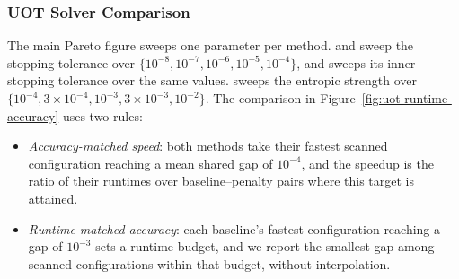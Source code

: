 \subsubsection{UOT Solver Comparison}
\label{app:uot-comparison-protocol}
The main Pareto figure sweeps one parameter per method.
\ours and \mm sweep the stopping tolerance over $\{10^{-8},10^{-7},10^{-6},10^{-5},10^{-4}\}$, and \hellouot sweeps its inner stopping tolerance over the same values.
\sinkhorn sweeps the entropic strength over $\{10^{-4},3\times10^{-4},10^{-3},3\times10^{-3},10^{-2}\}$.
The comparison in Figure~\ref{fig:uot-runtime-accuracy} uses two rules:
\begin{itemize}
\item \emph{Accuracy-matched speed}: both methods take their fastest scanned configuration reaching a mean shared gap of $10^{-4}$, and the speedup is the ratio of their runtimes over baseline--penalty pairs where this target is attained.
\item \emph{Runtime-matched accuracy}: each baseline's fastest configuration reaching a gap of $10^{-3}$ sets a runtime budget, and we report the smallest \ours gap among scanned configurations within that budget, without interpolation.
\end{itemize}

